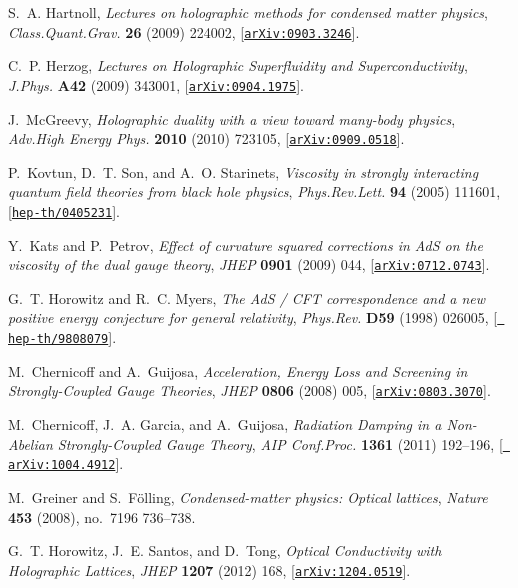 \documentclass[12pt,a4paper]{article}
\begin{document}
\begin{thebibliography}{100}
S.~A. Hartnoll, {\it {Lectures on holographic methods for condensed matter
  physics}},  {\em Class.Quant.Grav.} {\bf 26} (2009) 224002,
  [\href{http://xxx.lanl.gov/abs/0903.3246}{{\tt arXiv:0903.3246}}].

C.~P. Herzog, {\it {Lectures on Holographic Superfluidity and
  Superconductivity}},  {\em J.Phys.} {\bf A42} (2009) 343001,
  [\href{http://xxx.lanl.gov/abs/0904.1975}{{\tt arXiv:0904.1975}}].

J.~McGreevy, {\it {Holographic duality with a view toward many-body physics}},
  {\em Adv.High Energy Phys.} {\bf 2010} (2010) 723105,
  [\href{http://xxx.lanl.gov/abs/0909.0518}{{\tt arXiv:0909.0518}}].

P.~Kovtun, D.~T. Son, and A.~O. Starinets, {\it {Viscosity in strongly
  interacting quantum field theories from black hole physics}},  {\em
  Phys.Rev.Lett.} {\bf 94} (2005) 111601,
  [\href{http://xxx.lanl.gov/abs/hep-th/0405231}{{\tt hep-th/0405231}}].

Y.~Kats and P.~Petrov, {\it {Effect of curvature squared corrections in AdS on
  the viscosity of the dual gauge theory}},  {\em JHEP} {\bf 0901} (2009) 044,
  [\href{http://xxx.lanl.gov/abs/0712.0743}{{\tt arXiv:0712.0743}}].

G.~T. Horowitz and R.~C. Myers, {\it {The AdS / CFT correspondence and a new
  positive energy conjecture for general relativity}},  {\em Phys.Rev.} {\bf
  D59} (1998) 026005, [\href{http://xxx.lanl.gov/abs/hep-th/9808079}{{\tt
  hep-th/9808079}}].

M.~Chernicoff and A.~Guijosa, {\it {Acceleration, Energy Loss and Screening in
  Strongly-Coupled Gauge Theories}},  {\em JHEP} {\bf 0806} (2008) 005,
  [\href{http://xxx.lanl.gov/abs/0803.3070}{{\tt arXiv:0803.3070}}].

M.~Chernicoff, J.~A. Garcia, and A.~Guijosa, {\it {Radiation Damping in a
  Non-Abelian Strongly-Coupled Gauge Theory}},  {\em AIP Conf.Proc.} {\bf 1361}
  (2011) 192--196, [\href{http://xxx.lanl.gov/abs/1004.4912}{{\tt
  arXiv:1004.4912}}].

M.~Greiner and S.~F{\"o}lling, {\it Condensed-matter physics: Optical
  lattices},  {\em Nature} {\bf 453} (2008), no.~7196 736--738.

G.~T. Horowitz, J.~E. Santos, and D.~Tong, {\it {Optical Conductivity with
  Holographic Lattices}},  {\em JHEP} {\bf 1207} (2012) 168,
  [\href{http://xxx.lanl.gov/abs/1204.0519}{{\tt arXiv:1204.0519}}].


\end{thebibliography}
\end{document}
